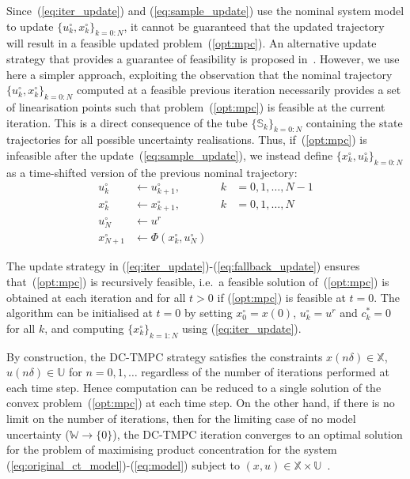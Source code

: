 \documentclass[final,5p,times,twocolumn,authoryear]{elsarticle}
\def\S{\mathbb{S}}
\def\X{\mathbb{X}}
\def\U{\mathbb{U}}
\def\W{\mathbb{W}}
\begin{document}
Since~(\ref{eq:iter_update}) and (\ref{eq:sample_update}) use the nominal system model to update $\{u^\circ_k , x^\circ_k\}_{k=0:N}$, it cannot be guaranteed that the updated trajectory will result in a feasible updated problem~(\ref{opt:mpc}).
An alternative update strategy that provides a guarantee of feasibility is proposed in~\citet{lishkova25:tac}. However, we use here a simpler approach, exploiting the observation that the nominal trajectory $\{u^\circ_k , x^\circ_k\}_{k=0:N}$ computed at a feasible previous iteration necessarily provides a set of linearisation points such that problem~(\ref{opt:mpc}) is feasible at the current iteration. This is a direct consequence of the tube $\{\S_k\}_{k=0:N}$ containing the state trajectories for all possible uncertainty realisations.
Thus, if~(\ref{opt:mpc}) is infeasible after the update~(\ref{eq:sample_update}), 
we instead define $\{x^\circ_k,u^\circ_k\}_{k=0:N}$ as a time-shifted version of the previous nominal trajectory:%
\begin{subequations}\label{eq:fallback_update}%
\begin{alignat}{2}
u^\circ_k &\gets u^\circ_{k+1}, & \ \ k &= 0,1,\ldots,N-1
\\
x^\circ_k &\gets x^\circ_{k+1}, &\ \ k &= 0,1,\ldots,N
\\
u^\circ_{N} &\gets u^r & &
\\
x^\circ_{N+1} &\gets \Phi (x_k^\circ, u_N^\circ) & &
\end{alignat}
\end{subequations}

The update strategy in (\ref{eq:iter_update})-(\ref{eq:fallback_update}) ensures that~(\ref{opt:mpc}) is recursively feasible, i.e.~a feasible solution of~(\ref{opt:mpc}) is obtained at each iteration and for all $t > 0$ if (\ref{opt:mpc}) is feasible at $t=0$.
%
The algorithm can be initialised at  $t=0$ by setting $x_0^\circ = x(0)$, $u^\circ_k = u^r$ and $c^\ast_k= 0$ for all $k$, and computing $\{x^\circ_k\}_{k=1:N}$ using (\ref{eq:iter_update}).

By construction, the DC-TMPC strategy satisfies the constraints $x(n\delta)\in\X$, $u(n\delta)\in\U$ for $n= 0,1,\ldots$ regardless of the number of iterations performed at each time step. Hence computation can be reduced to a single
solution of the convex problem~(\ref{opt:mpc}) at each time step. On the other hand, if there is no limit on the number of iterations, then for the limiting case of no model uncertainty ($\W\to\{0\}$), the DC-TMPC iteration converges to an optimal solution for the problem of maximising product concentration for the system (\ref{eq:original_ct_model})-(\ref{eq:model}) subject to $(x,u)\in\X\times\U$~\citep[see][]{lishkova25:tac}.
\end{document}
